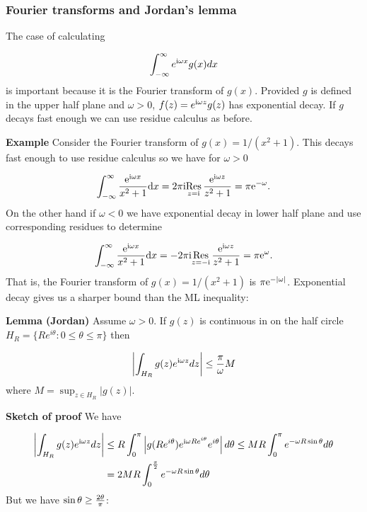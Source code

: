 \documentclass[12pt,landscape]{article}
\def\D{ {\rm d} }
\def\I{ {\rm i} }
\def\E{ {\rm e} }
\def\Res_#1{\underset{#1}{\rm Res}\,}
\begin{document}
{\newpage
\subsubsection{Fourier transforms and Jordan's lemma}
The case of calculating

\[
    \int_{-\infty}^\infty e^{\I \omega x} g(x) dx
\]
is important because it is the Fourier transform of $g(x)$. Provided $g$ is defined in the upper half plane and $\omega > 0$, $f(z) = e^{\I \omega z} g(z)$  has exponential decay. If $g$ decays fast enough we can use residue calculus as before.

\textbf{Example} Consider the Fourier transform of $g(x) = 1/(x^2+1)$. This decays fast enough to use residue calculus so we have for $\omega > 0$

\[
\int_{-\infty}^\infty {\E^{\I \omega x } \over x^2 + 1} \D x = 2 \pi \I \Res_{z = \I} {\E^{\I \omega z } \over z^2 + 1} = \pi \E^{-\omega}.
\]
On the other hand if $\omega < 0$ we have exponential decay in lower half plane and use corresponding residues to determine

\[
\int_{-\infty}^\infty {\E^{\I \omega x } \over x^2 + 1} \D x = -2 \pi \I \Res_{z = -\I} {\E^{\I \omega z } \over z^2 + 1} = \pi \E^{\omega}.
\]
That is, the Fourier transform of $g(x) = 1/(x^2+1)$ is $\pi \E^{-|\omega|}$.
\newpage
Exponential decay gives us a  sharper bound than the ML inequality:

\textbf{Lemma (Jordan)} Assume $\omega > 0$. If $g(z)$ is continuous in on the half circle $H_R = \{ R e^{i \theta} : 0 \leq \theta \leq \pi \}$  then

\[
\left| \int_{H_R} g(z) e^{\I \omega z} dz \right| \leq {\pi \over \omega} M
\]
where $M = \sup_{z \in H_R} |g(z)|$.

\textbf{Sketch of proof} We have


\begin{align*}
\left| \int_{H_R} g(z) e^{\I \omega z} dz \right|  & \leq   R \int_0^\pi \left|g(R e^{i \theta}) e^{\I \omega R e^{i \theta}}e^{i \theta}\right| d\theta
\leq MR \int_0^\pi e^{- \omega R\sin \theta } d\theta
\\
&= 2MR \int_0^{\pi\over 2} e^{- \omega R\sin \theta } d\theta
\end{align*}
\newpage
But we have $\sin \theta \geq {2 \theta \over \pi}$:


}
\end{document}
